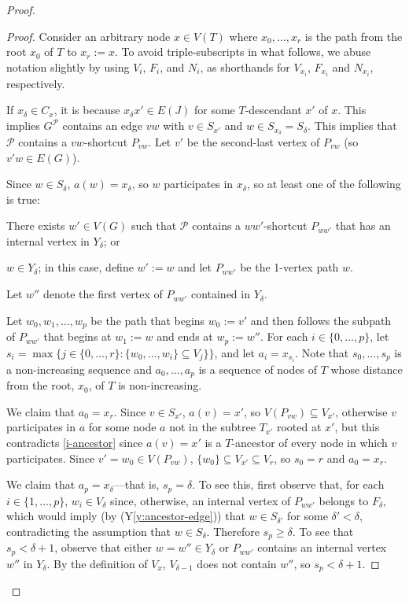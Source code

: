 \documentclass{patmorin}
\newcommand{\yref}[1]{(Y\ref{y:#1})}
\renewcommand{\ge}{\geqslant}
\begin{document}
\begin{proof}
\begin{proof}
  Consider an arbitrary node $x\in V(T)$ where $x_0,\ldots,x_r$ is the path from the root $x_0$ of $T$ to $x_r:=x$.  To avoid triple-subscripts in what follows, we abuse notation slightly by using $V_i$, $F_i$, and $N_i$,  as shorthands for $V_{x_i}$, $F_{x_i}$ and $N_{x_i}$, respectively.

  If $x_\delta\in C_x$, it is because $x_\delta x'\in E(J)$ for some $T$-descendant $x'$ of $x$.  This implies $G^{\mathcal{P}}$ contains an edge $vw$ with $v\in S_{x'}$ and $w\in S_{x_\delta}=S_\delta$.  This implies that $\mathcal{P}$ contains a $vw$-shortcut $P_{vw}$.  Let $v'$ be the second-last vertex of $P_{vw}$ (so $v'w\in E(G)$).

  Since $w\in S_{\delta}$, $a(w)=x_\delta$, so $w$ participates in $x_\delta$, so at least one of the following is true:
  \begin{compactenum}
    \item There exists $w'\in V(G)$ such that $\mathcal{P}$ contains a $ww'$-shortcut $P_{ww'}$ that has an internal vertex in $Y_{\delta}$; or
    \item $w\in Y_\delta$; in this case, define $w':=w$ and let $P_{ww'}$ be the 1-vertex path $w$.
  \end{compactenum}
  Let $w''$ denote the first vertex of $P_{ww'}$ contained in $Y_{\delta}$.

  Let $w_0,w_1,\ldots,w_p$ be the path that begins $w_0:=v'$ and then follows the subpath of $P_{ww'}$ that begins at $w_1:=w$ and ends at $w_p:=w''$.  For each $i\in\{0,\ldots,p\}$, let $s_i=\max\{j\in\{0,\ldots,r\}: \{w_0,\ldots,w_i\}\subseteq V_{j}\}\}$, and let $a_i=x_{s_i}$.  Note that $s_0,\ldots,s_p$ is a non-increasing sequence and $a_0,\ldots,a_p$ is a sequence of nodes of $T$ whose distance from the root, $x_0$, of $T$ is non-increasing.

  We claim that $a_0=x_r$.  Since $v\in S_{x'}$, $a(v)=x'$, so $V(P_{vw})\subseteq V_{x'}$, otherwise $v$ participates in $a$ for some node $a$ not in the subtree $T_{x'}$ rooted at $x'$, but this contradicts \cref{i-ancestor} since $a(v)=x'$ is a $T$-ancestor of every node in which $v$ participates.  Since $v'=w_0\in V(P_{vw})$, $\{w_0\}\subseteq V_{x'}\subseteq V_{r}$, so $s_0=r$ and $a_0=x_r$.

  We claim that $a_p=x_\delta$---that is, $s_p=\delta$.
  To see this, first observe that, for each $i\in\{1,\ldots,p\}$, $w_i\in V_{\delta}$ since, otherwise, an internal vertex of $P_{ww'}$ belongs to $F_\delta$, which would imply (by \yref{ancestor-edge}) that $w\in S_{\delta'}$ for some $\delta' < \delta$, contradicting the assumption that $w\in S_\delta$.  Therefore $s_p\ge\delta$.  To see that $s_p<\delta+1$,
  observe that either $w=w''\in Y_\delta$ or $P_{ww'}$ contains an internal vertex $w''$ in $Y_\delta$.  By the definition of $V_x$, $V_{\delta-1}$ does not contain $w''$, so $s_p<\delta+1$.


\end{proof}
\end{proof}
\end{document}

